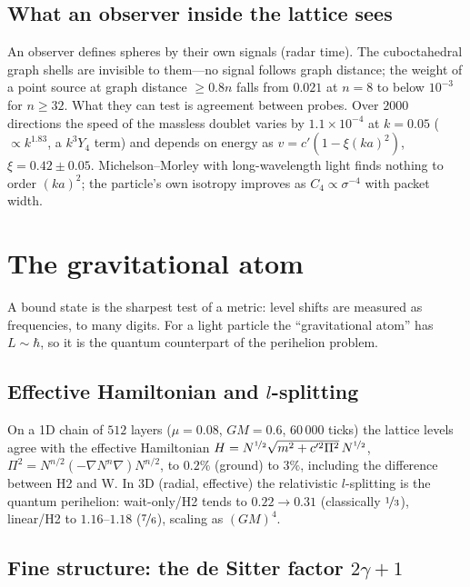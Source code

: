 \documentclass[twocolumn,showpacs,preprintnumbers,amsmath,amssymb]{revtex4-2}
\newcommand{\cpr}{c'}
\begin{document}
\subsection{What an observer inside the lattice sees}

An observer defines spheres by their own signals (radar time).
The cuboctahedral graph shells are invisible to them---no signal follows graph
distance; the weight of a point source at graph distance $\ge0.8n$
falls from $0.021$ at $n=8$ to below $10^{-3}$ for $n\ge32$.
What they can test is agreement between probes.
Over $2000$ directions the speed of the massless doublet varies by
$1.1\times10^{-4}$ at $k=0.05$ ($\propto k^{1.83}$, a $k^{3}Y_4$ term) and
depends on energy as $v=\cpr(1-\xi(ka)^{2})$, $\xi=0.42\pm0.05$.
Michelson--Morley with long-wavelength light finds nothing to order $(ka)^{2}$;
the particle's own isotropy improves as $C_4\propto\sigma^{-4}$ with packet
width.

\section{The gravitational atom}
\label{sec:atom}

A bound state is the sharpest test of a metric: level shifts are measured as
frequencies, to many digits.
For a light particle the ``gravitational atom'' has $L\sim\hbar$, so it is the
quantum counterpart of the perihelion problem.

\subsection{Effective Hamiltonian and $l$-splitting}

On a 1D chain of $512$ layers ($\mu=0.08$, $GM=0.6$, $60\,000$ ticks) the lattice
levels agree with the effective Hamiltonian
$H=N^{\nicefrac12}\sqrt{m^{2}+\cpr^{2}\Pi^{2}}\,N^{\nicefrac12}$,
$\Pi^{2}=N^{n/2}(-\nabla N^{n}\nabla)N^{n/2}$, to $0.2\%$ (ground) to $3\%$,
including the difference between H2 and W.
In 3D (radial, effective) the relativistic $l$-splitting is the quantum
perihelion: wait-only/H2 tends to $0.22\to0.31$ (classically $\nicefrac13$),
linear/H2 to $1.16$--$1.18$ ($\nicefrac76$), scaling as $(GM)^{4}$.

\subsection{Fine structure: the de Sitter factor $2\gamma+1$}
\end{document}
